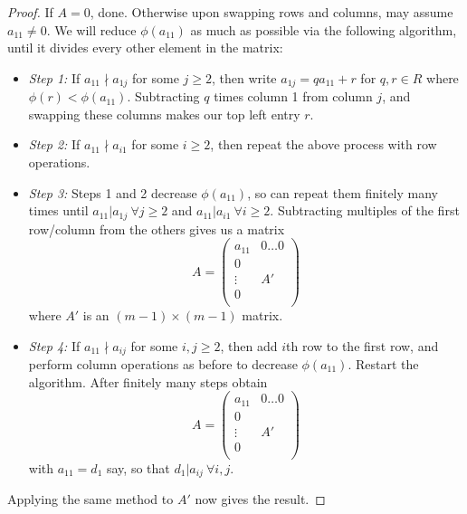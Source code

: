 \documentclass[egregdoesnotlikesansseriftitles,a4paper]{scrartcl}
\begin{document}
\begin{proof}
        If $A =0$, done. Otherwise upon swapping rows and columns, may assume $a_{11} \neq 0$. We will reduce $\phi (a_{11} )$ as much as possible via the following algorithm, until it divides every other element in the matrix: 
        \begin{itemize}
               \item \emph{Step 1:} If $a_{11} \nmid a_{1j }$ for some $j \geq 2 $, then write $a_{1j }=q a_{11}+r$ for $q,r \in R$ where $\phi (r)< \phi (a_{11} )$. Subtracting $q$ times column 1 from column $j$, and swapping these columns makes our top left entry $r$.
               \item \emph{Step 2:} If $a_{11} \nmid a_{i1}$ for some $i \geq 2$, then repeat the above process with row operations.
               \item \emph{Step 3:} Steps 1 and 2 decrease $\phi (a_{11} )$, so can repeat them finitely many times until $a_{11} | a_{1j } \ \forall j \geq 2$ and $a_{11} | a_{i1 } \ \forall i \geq 2$. Subtracting multiples of the first row/column from the others gives us a matrix \[
               A= \left(
               \begin{array}{c|c}
                      a_{11}  &0 \ldots 0\\
                      \hline
                      0&\\
                      \vdots& A'\\
                      0&\\
                      \end{array}
               \right)
               \] where $A'$ is an $(m-1)\times (m-1)$ matrix.
               \item \emph{Step 4:} If $a_{11} \nmid a_{ij}$ for some $i, j \geq 2$, then add $i$th row to the first row, and perform column operations as before to decrease $\phi (a_{11} )$. Restart the algorithm. After finitely many steps obtain \[
               A = \left(
                     \begin{array}{c|c}
                            a_{11}  &0 \ldots 0\\
                            \hline
                            0&\\
                            \vdots& A'\\
                            0&\\
                            \end{array}
                     \right)
               \] with $a_{11} =d_1 $ say, so that $d_1 | a_{ij} \ \forall i,j$. 
        \end{itemize}
        Applying the same method to $A'$ now gives the result. 
\end{proof}
\end{document}
